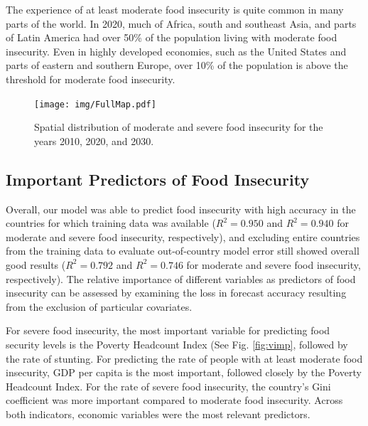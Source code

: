 \documentclass{article}
\begin{document}
The experience of at least moderate food insecurity is quite common in many parts of the world.  In 2020, much of Africa, south and southeast Asia, and parts of Latin America had over 50\% of the population living with moderate food insecurity.  Even in highly developed economies, such as the United States and parts of eastern and southern Europe, over 10\% of the population is above the threshold for moderate food insecurity.

\begin{landscape}
\begin{figure}[h]
  \centering
  \texttt{[image: img/FullMap.pdf]}
  \caption{Spatial distribution of moderate and severe food insecurity for the years 2010, 2020, and 2030.}
  \label{fig:map}
\end{figure}
\end{landscape}

\subsection{Important Predictors of Food Insecurity}
Overall, our model was able to predict food insecurity with high accuracy in the countries for which training data was available ($R^2 = 0.950$ and $R^2 = 0.940$ for moderate and severe food insecurity, respectively), and excluding entire countries from the training data to evaluate out-of-country model error still showed overall good results ($R^2 = 0.792$ and $R^2 = 0.746$ for moderate and severe food insecurity, respectively).  The relative importance of different variables as predictors of food insecurity can be assessed by examining the loss in forecast accuracy resulting from the exclusion of particular covariates.

For severe food insecurity, the most important variable for predicting food security levels is the Poverty Headcount Index (See Fig. \ref{fig:vimp}, followed by the rate of stunting.  For predicting the rate of people with at least moderate food insecurity, GDP per capita is the most important, followed closely by the Poverty Headcount Index.  For the rate of severe food insecurity, the country's Gini coefficient was more important compared to moderate food insecurity.  Across both indicators, economic variables were the most relevant predictors.
\end{document}
